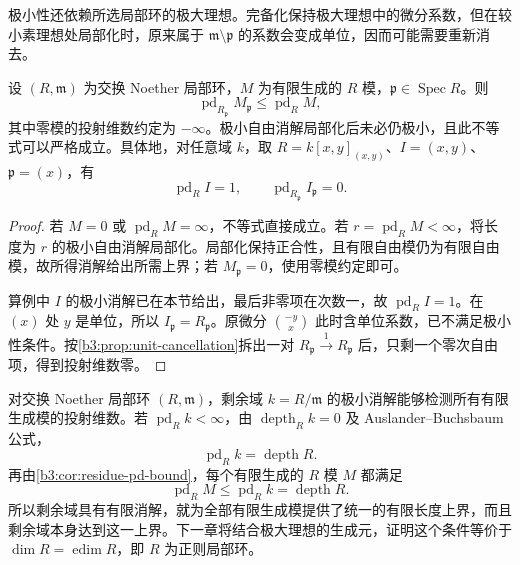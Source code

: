 极小性还依赖所选局部环的极大理想。完备化保持极大理想中的微分系数，但在较小素理想处局部化时，原来属于 \(\mathfrak m\setminus\mathfrak p\) 的系数会变成单位，因而可能需要重新消去。

\begin{proposition}\label{b3:prop:localization-pd-drop}
	设 \((R,\mathfrak m)\) 为交换 Noether 局部环，\(M\) 为有限生成的 \(R\) 模，\(\mathfrak p\in\operatorname{Spec}R\)。则
	\[
		\operatorname{pd}_{R_{\mathfrak p}}M_{\mathfrak p}\le\operatorname{pd}_RM,
	\]
	其中零模的投射维数约定为 \(-\infty\)。极小自由消解局部化后未必仍极小，且此不等式可以严格成立。具体地，对任意域 \(k\)，取 \(R=k[x,y]_{(x,y)}\)、\(I=(x,y)\)、\(\mathfrak p=(x)\)，有
	\[
		\operatorname{pd}_RI=1,\qquad \operatorname{pd}_{R_{\mathfrak p}}I_{\mathfrak p}=0.
	\]
\end{proposition}
\begin{proof}
	若 \(M=0\) 或 \(\operatorname{pd}_RM=\infty\)，不等式直接成立。若 \(r=\operatorname{pd}_RM<\infty\)，将长度为 \(r\) 的极小自由消解局部化。局部化保持正合性，且有限自由模仍为有限自由模，故所得消解给出所需上界；若 \(M_{\mathfrak p}=0\)，使用零模约定即可。

	算例中 \(I\) 的极小消解已在本节给出，最后非零项在次数一，故 \(\operatorname{pd}_RI=1\)。在 \((x)\) 处 \(y\) 是单位，所以 \(I_{\mathfrak p}=R_{\mathfrak p}\)。原微分 \(\binom{-y}{x}\) 此时含单位系数，已不满足极小性条件。按\cref{b3:prop:unit-cancellation}拆出一对 \(R_{\mathfrak p}\xrightarrow{1}R_{\mathfrak p}\) 后，只剩一个零次自由项，得到投射维数零。
\end{proof}

对交换 Noether 局部环 \((R,\mathfrak m)\)，剩余域 \(k=R/\mathfrak m\) 的极小消解能够检测所有有限生成模的投射维数。若 \(\operatorname{pd}_Rk<\infty\)，由 \(\operatorname{depth}_Rk=0\) 及 Auslander–Buchsbaum 公式，
\[
	\operatorname{pd}_Rk=\operatorname{depth}R.
\]
再由\cref{b3:cor:residue-pd-bound}，每个有限生成的 \(R\) 模 \(M\) 都满足
\[
	\operatorname{pd}_RM\le\operatorname{pd}_Rk=\operatorname{depth}R.
\]
所以剩余域具有有限消解，就为全部有限生成模提供了统一的有限长度上界，而且剩余域本身达到这一上界。下一章将结合极大理想的生成元，证明这个条件等价于 \(\dim R=\operatorname{edim}R\)，即 \(R\) 为正则局部环。

